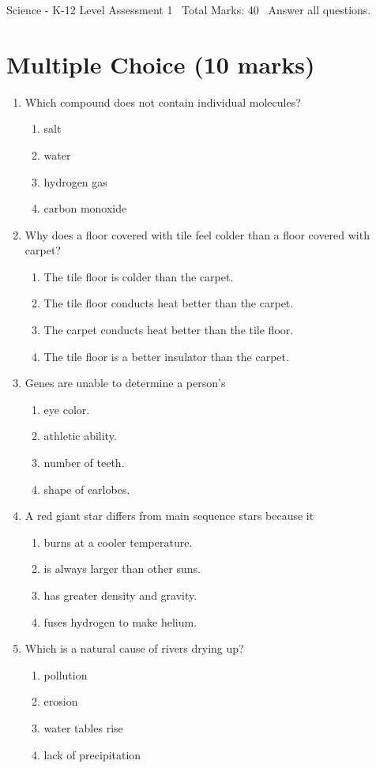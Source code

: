\documentclass[12pt]{article}
\begin{document}
\begin{center}
Science - K-12 Level Assessment 1 \
Total Marks: 40 \
Answer all questions.
\end{center}

\section*{Multiple Choice (10 marks)}
\begin{enumerate}[label=\arabic*.]
\item Which compound does not contain individual molecules?
\begin{enumerate}[label=(\alph*)]
    \item salt
    \item water
    \item hydrogen gas
    \item carbon monoxide
\end{enumerate}
\item Why does a floor covered with tile feel colder than a floor covered with carpet?
\begin{enumerate}[label=(\alph*)]
    \item The tile floor is colder than the carpet.
    \item The tile floor conducts heat better than the carpet.
    \item The carpet conducts heat better than the tile floor.
    \item The tile floor is a better insulator than the carpet.
\end{enumerate}
\item Genes are unable to determine a person's
\begin{enumerate}[label=(\alph*)]
    \item eye color.
    \item athletic ability.
    \item number of teeth.
    \item shape of earlobes.
\end{enumerate}
\item A red giant star differs from main sequence stars because it
\begin{enumerate}[label=(\alph*)]
    \item burns at a cooler temperature.
    \item is always larger than other suns.
    \item has greater density and gravity.
    \item fuses hydrogen to make helium.
\end{enumerate}
\item Which is a natural cause of rivers drying up?
\begin{enumerate}[label=(\alph*)]
    \item pollution
    \item erosion
    \item water tables rise
    \item lack of precipitation
\end{enumerate}
\end{enumerate}
\end{document}
